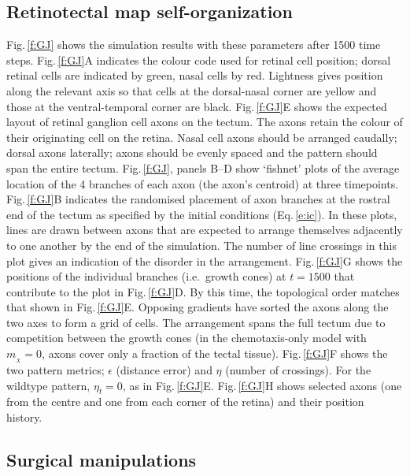 \documentclass[9pt,lineno,draft]{elife}
\begin{document}
\subsection*{Retinotectal map self-organization}

Fig.\,\ref{f:GJ} shows the simulation results with these parameters after 1500 time steps.
Fig.\,\ref{f:GJ}A indicates the colour code used for retinal cell position; dorsal retinal cells are indicated by green, nasal cells by red. Lightness gives position along the relevant axis so that cells at the dorsal-nasal corner are yellow and those at the ventral-temporal corner are black.
Fig.\,\ref{f:GJ}E shows the expected layout of retinal ganglion cell axons on the tectum.
The axons retain the colour of their originating cell on the retina.
Nasal cell axons should be arranged caudally; dorsal axons laterally; axons should be evenly spaced and the pattern should span the entire tectum.
Fig.\,\ref{f:GJ}, panels B--D show `fishnet' plots of the average location of the 4 branches of each axon (the axon's centroid) at three timepoints.
Fig.\,\ref{f:GJ}B indicates the randomised placement of axon branches at the rostral end of the tectum as specified by the initial conditions (Eq.\,\ref{e:ic}).
In these plots, lines are drawn between axons that are expected to arrange themselves adjacently to one another by the end of the simulation.
The number of line crossings in this plot gives an indication of the disorder in the arrangement.
Fig.\,\ref{f:GJ}G shows the positions of the individual branches (i.e.~growth cones) at $t=1500$ that contribute to the plot in Fig.\,\ref{f:GJ}D.
By this time, the topological order matches that shown in Fig.\,\ref{f:GJ}E.
Opposing gradients have sorted the axons along the two axes to form a grid of cells.
The arrangement spans the full tectum due to competition between the growth cones (in the chemotaxis-only model with $m_{\!_X}=0$, axons cover only a fraction of the tectal tissue).
Fig.\,\ref{f:GJ}F shows the two pattern metrics; $\epsilon$ (distance error) and $\eta$ (number of crossings).
For the wildtype pattern, $\eta_t=0$, as in Fig.\,\ref{f:GJ}E.
Fig.\,\ref{f:GJ}H shows selected axons (one from the centre and one from each corner of the retina) and their position history.

\subsection*{Surgical manipulations}
\end{document}
